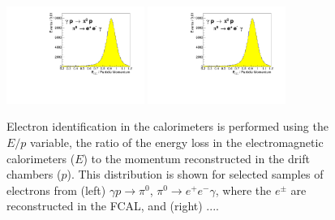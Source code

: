 \begin{figure}[tbp]
\begin{center}
\includegraphics[width=0.4\textwidth]{figures/fcal_ep.pdf}
\includegraphics[width=0.4\textwidth]{figures/fcal_ep.pdf}
\caption{\label{fig:performeop}
Electron identification in the calorimeters is performed using the $E/p$ variable, the ratio of the energy loss in the electromagnetic calorimeters ($E$) to the momentum reconstructed in the drift chambers ($p$).  This distribution is shown for selected samples of electrons from (left) $\gamma p \to \pi^0$, $\pi^0 \to e^+e^-\gamma$, where the $e^\pm$ are reconstructed in the FCAL, and (right) ....
}
\end{center}
\end{figure}



